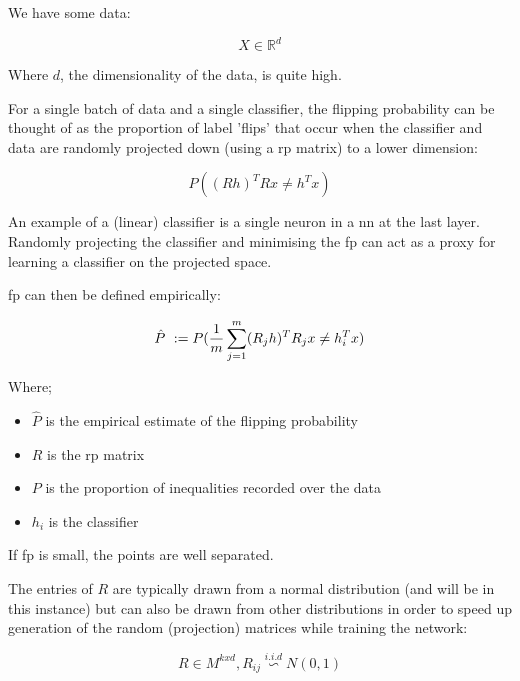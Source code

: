 We have some data:

\begin{equation}
X \in \mathds{R}^d 
\end{equation}

Where $d$, the dimensionality of the data, is quite high. \bigskip

For a single batch of data and a single classifier, the flipping probability can be thought of as the proportion of label 'flips' that occur when the classifier and data are randomly projected down (using a \gls{rp} matrix) to a lower dimension:

\begin{equation}
P((R h)^T Rx \neq h^{T}x)  
\end{equation}

An example of a (linear) classifier is a single neuron in a \gls{nn} at the last layer. Randomly projecting the classifier and minimising the \gls{fp} can act as a proxy for learning a classifier on the projected space. \smallskip

 \gls{fp} can then be defined empirically:

\begin{equation}
\hat{P}\ := \\ P(\frac{1}{m}\sum_{j = 1}^m (R_j h)^T R_{j}x \neq h_i^{T}x)  
\end{equation}

Where;  \smallskip

\begin{itemize}
\item $\hat{P}$ is the empirical estimate of the flipping probability  
\item $R$ is the \gls{rp} matrix  
\item $P$ is the proportion of inequalities recorded over the data 
\item $h_i$ is the classifier  
\end{itemize}

If  \gls{fp} is small, the points are well separated. \bigskip

The entries of $R$ are typically drawn from a normal distribution (and will be in this instance) but can also be drawn from other distributions in order to speed up generation of the random (projection) matrices while training the network:

\begin{equation}
R \in M^{kxd}, R_{ij} \stackrel{i.i.d}{\backsim} N(0,1) 
\end{equation}

